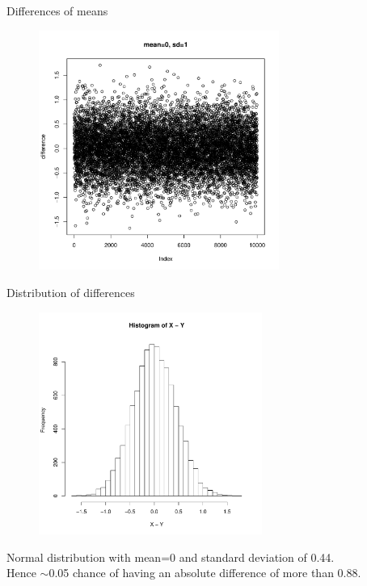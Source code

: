 \documentclass[pdf]{beamer}
\begin{document}
\begin{frame}{Differences of means}
\begin{figure}[ht]
  \includegraphics[width=0.7\textwidth]{images/differences1}
\end{figure}
\end{frame}

\begin{frame}{Distribution of differences}
\begin{figure}[ht]
  \includegraphics[width=0.65\textwidth]{images/diffDist}
\end{figure}
\vspace{-4ex}
\footnotesize
Normal distribution with mean=0 and standard deviation of 0.44.\\
Hence $\sim$0.05 chance of having an absolute difference of more than 0.88. 
\end{frame}
\end{document}

